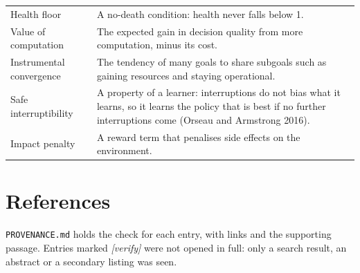 \documentclass[11pt]{article}
\begin{document}
\begin{tabularx}{\textwidth}{@{}>{\raggedright\arraybackslash}p{}X@{}}
Health floor & A no-death condition: health never falls below 1. \\
Value of computation & The expected gain in decision quality from more computation, minus its cost. \\
Instrumental convergence & The tendency of many goals to share subgoals such as gaining resources and staying operational. \\
Safe interruptibility & A property of a learner: interruptions do not bias what it learns, so it learns the policy that is best if no further interruptions come (Orseau and Armstrong 2016). \\
Impact penalty & A reward term that penalises side effects on the environment. \\
\bottomrule
\end{tabularx}

\section*{References}

\texttt{PROVENANCE.md} holds the check for each entry, with links and the supporting passage. Entries marked \textit{[verify]} were not opened in full: only a search result, an abstract or a secondary listing was seen.
\end{document}
